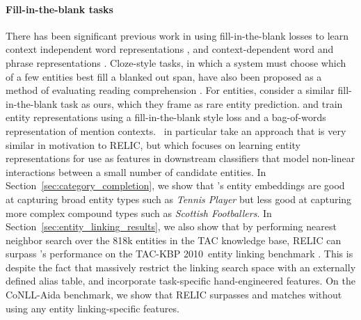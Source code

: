 \documentclass{article} \usepackage{iclr2020_conference,times}
\newcommand{\ack}{RELIC\xspace}
\newcommand{\tac}{TAC-KBP 2010}
\begin{document}
\paragraph{Fill-in-the-blank tasks} 
There has been significant previous work in using fill-in-the-blank losses to learn context independent word representations \citep{mikolov2013distributed}, and context-dependent word and phrase representations \citep{dai2015semi,peters2018deep,radford2018improving,devlin2018bert}.
Cloze-style tasks, in which a system must choose which of a few entities best fill a blanked out span, have also been proposed as a method of evaluating reading comprehension \citep{Hermann:15, long2016leveraging, Onishi:16}. 
For entities, \citet{long2017world} consider a similar fill-in-the-blank task as ours, which they frame as rare entity prediction.
\citet{yamada2016joint} and \citet{yamada-etal-2017-learning} train entity representations using a fill-in-the-blank style loss and a bag-of-words representation of mention contexts. 
\citet{yamada2016joint, yamada-etal-2017-learning}~in particular take an approach that is very similar in motivation to \ack, but which focuses on learning entity representations for use as features in downstream classifiers that model non-linear interactions between a small number of candidate entities. 
In Section~\ref{sec:category_completion}, we show that \cite{yamada-etal-2017-learning}'s entity embeddings are good at capturing broad entity types such as {\it Tennis Player} but less good at capturing more complex compound types such as {\it Scottish Footballers}. 
In Section~\ref{sec:entity_linking_results}, we also show that by performing nearest neighbor search over the 818k entities in the TAC knowledge base, \ack can surpass \citealt{yamada-etal-2017-learning}'s performance on the \tac~entity linking benchmark \citep{Ji10overviewof}. This is despite the fact that \citeauthor{yamada-etal-2017-learning} massively restrict the linking search space with an externally defined alias table, and incorporate task-specific hand-engineered features. On the CoNLL-Aida benchmark, we show that \ack surpasses \citealt{yamada-etal-2017-learning} and matches \citealt{Raiman2018-hm} without using any entity linking-specific features.
\end{document}
